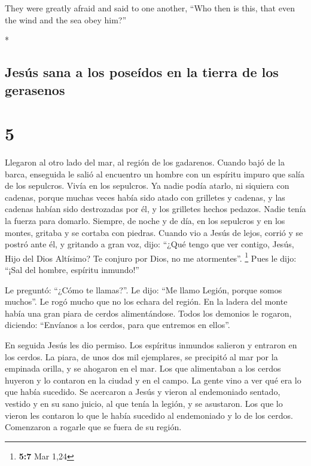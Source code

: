 \begin{paracol}{2}
\begin{otherlanguage}{english}
 They were greatly afraid and said to one another, ``Who
then is this, that even the wind and the sea obey him?''

\end{otherlanguage}

\switchcolumn[0]*

\hypertarget{jesuxfas-sana-a-los-poseuxeddos-en-la-tierra-de-los-gerasenos}{%
\subsection{Jesús sana a los poseídos en la tierra de los
gerasenos}\label{jesuxfas-sana-a-los-poseuxeddos-en-la-tierra-de-los-gerasenos}}

\hypertarget{section-8}{%
\section{5}\label{section-8}}

 Llegaron al otro lado del mar, al región de los
gadarenos.  Cuando bajó de la barca, enseguida le salió al
encuentro un hombre con un espíritu impuro que salía de los sepulcros.
 Vivía en los sepulcros. Ya nadie podía atarlo, ni
siquiera con cadenas,  porque muchas veces había sido
atado con grilletes y cadenas, y las cadenas habían sido destrozadas por
él, y los grilletes hechos pedazos. Nadie tenía la fuerza para domarlo.
 Siempre, de noche y de día, en los sepulcros y en los
montes, gritaba y se cortaba con piedras.  Cuando vio a
Jesús de lejos, corrió y se postró ante él,  y gritando a
gran voz, dijo: ``¿Qué tengo que ver contigo, Jesús, Hijo del Dios
Altísimo? Te conjuro por Dios, no me atormentes''. \footnote{\textbf{5:7}
  Mar 1,24}  Pues le dijo: ``¡Sal del hombre, espíritu
inmundo!''

 Le preguntó: ``¿Cómo te llamas?''. Le dijo: ``Me llamo
Legión, porque somos muchos''.  Le rogó mucho que no los
echara del región.  En la ladera del monte había una gran
piara de cerdos alimentándose.  Todos los demonios le
rogaron, diciendo: ``Envíanos a los cerdos, para que entremos en
ellos''.

 En seguida Jesús les dio permiso. Los espíritus inmundos
salieron y entraron en los cerdos. La piara, de unos dos mil ejemplares,
se precipitó al mar por la empinada orilla, y se ahogaron en el mar.
 Los que alimentaban a los cerdos huyeron y lo contaron
en la ciudad y en el campo. La gente vino a ver qué era lo que había
sucedido.  Se acercaron a Jesús y vieron al endemoniado
sentado, vestido y en su sano juicio, al que tenía la legión, y se
asustaron.  Los que lo vieron les contaron lo que le
había sucedido al endemoniado y lo de los cerdos. 
Comenzaron a rogarle que se fuera de su región.


\end{paracol}
